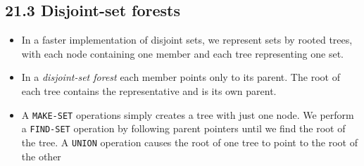 \documentclass{report}
\begin{document}
\subsection*{21.3 Disjoint-set forests}
\begin{itemize}
    \item In a faster implementation of disjoint sets, we represent sets by rooted trees, with each node containing one member and each tree representing one set.
    \item In a \textit{disjoint-set forest} each member points only to its parent. The root of each tree contains the representative and is its own parent.
    \item A \texttt{MAKE-SET} operations simply creates a tree with just one node. We perform a \texttt{FIND-SET} operation by following parent pointers until we find the root of the tree. A \texttt{UNION} operation causes the root of one tree to point to the root of the other
\end{itemize}
\end{document}

